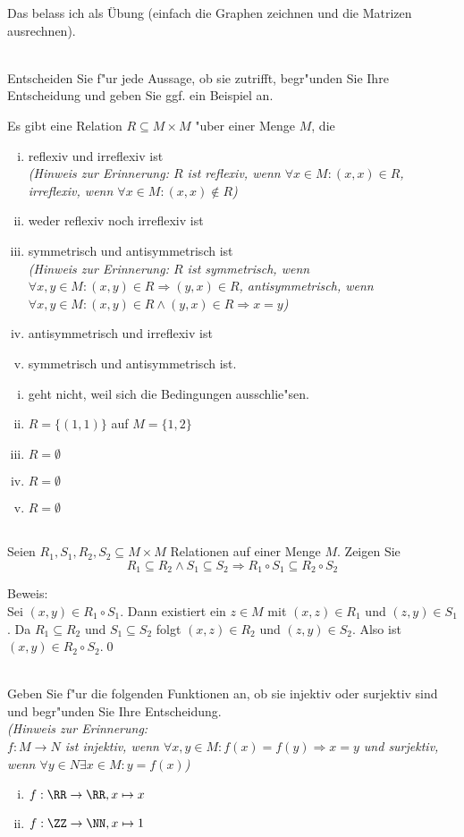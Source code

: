 \begin{loesung}
Das belass ich als Übung (einfach die Graphen zeichnen und die Matrizen ausrechnen).
\end{loesung}

\\
Entscheiden Sie f"ur jede Aussage, ob sie zutrifft, begr"unden Sie Ihre Entscheidung und geben Sie ggf. ein Beispiel an.

Es gibt eine Relation $R\subseteq M\times M$ "uber einer Menge $M$, die 
\begin{enumerate}[(i)]
\item reflexiv und irreflexiv ist\\
\textit{(Hinweis zur Erinnerung: $R$ ist reflexiv, wenn $\forall x\in M:(x,x)\in R$, irreflexiv, wenn $\forall x\in M:(x,x)\notin R$)}
\item weder reflexiv noch irreflexiv ist
\item symmetrisch und antisymmetrisch ist\\
\textit{(Hinweis zur Erinnerung: $R$ ist symmetrisch, wenn $\forall x,y\in M:(x,y)\in R\Rightarrow (y,x)\in R$, antisymmetrisch, wenn $\forall x,y\in M:(x,y)\in R\wedge (y,x)\in R\Rightarrow x=y$)}
\item antisymmetrisch und irreflexiv ist
\item symmetrisch und antisymmetrisch ist.
\end{enumerate}

\begin{loesung}
\begin{enumerate}[(i)]
\item geht nicht, weil sich die Bedingungen ausschlie"sen.
\item $R=\{(1,1)\}$ auf $M=\{1,2\}$
\item $R=\emptyset$
\item $R=\emptyset$
\item $R=\emptyset$
\end{enumerate}
\end{loesung}
\\
Seien $R_1,S_1,R_2,S_2\subseteq M\times M$ Relationen auf einer Menge $M$. Zeigen Sie \[R_1\subseteq R_2\wedge S_1\subseteq S_2\Rightarrow R_1\circ S_1\subseteq R_2\circ S_2\]

\begin{loesung}
Beweis:\\
Sei $(x,y)\in R_1\circ S_1$. Dann existiert ein $z\in M$ mit $(x,z)\in R_1$ und $(z,y)\in S_1$. Da $R_1\subseteq R_2$ und $S_1\subseteq S_2$ folgt $(x,z)\in R_2$ und $(z,y)\in S_2$. Also ist $(x,y)\in R_2\circ S_2$.\qed
\end{loesung}
\\
Geben Sie f"ur die folgenden Funktionen an, ob sie injektiv oder surjektiv sind und begr"unden Sie Ihre Entscheidung.\\
\textit{(Hinweis zur Erinnerung:\\$f:M\to N$ ist injektiv, wenn $\forall x,y\in M:f(x)=f(y)\Rightarrow x=y$ und surjektiv, wenn $\forall y\in N\exists x\in M:y=f(x)$)}

\begin{enumerate}[(i)]
\item $f:\RR\to\RR, x\mapsto x$
\item $f:\ZZ\to\NN, x\mapsto 1$
\end{enumerate}

